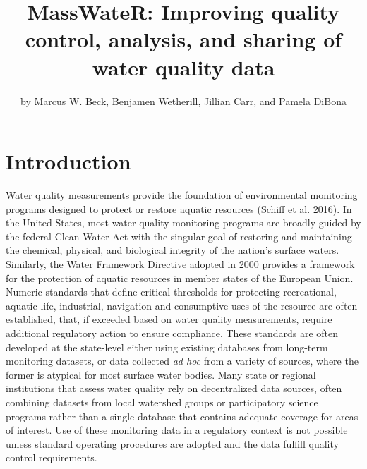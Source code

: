 \title{MassWateR: Improving quality control, analysis, and sharing of water quality data}
\author{by Marcus W. Beck, Benjamen Wetherill, Jillian Carr, and Pamela DiBona}

\maketitle


\hypertarget{introduction}{%
\section{Introduction}\label{introduction}}

Water quality measurements provide the foundation of environmental monitoring programs designed to protect or restore aquatic resources (Schiff et al. 2016). In the United States, most water quality monitoring programs are broadly guided by the federal Clean Water Act with the singular goal of restoring and maintaining the chemical, physical, and biological integrity of the nation's surface waters. Similarly, the Water Framework Directive adopted in 2000 provides a framework for the protection of aquatic resources in member states of the European Union. Numeric standards that define critical thresholds for protecting recreational, aquatic life, industrial, navigation and consumptive uses of the resource are often established, that, if exceeded based on water quality measurements, require additional regulatory action to ensure compliance. These standards are often developed at the state-level either using existing databases from long-term monitoring datasets, or data collected \emph{ad hoc} from a variety of sources, where the former is atypical for most surface water bodies. Many state or regional institutions that assess water quality rely on decentralized data sources, often combining datasets from local watershed groups or participatory science programs rather than a single database that contains adequate coverage for areas of interest. Use of these monitoring data in a regulatory context is not possible unless standard operating procedures are adopted and the data fulfill quality control requirements.


